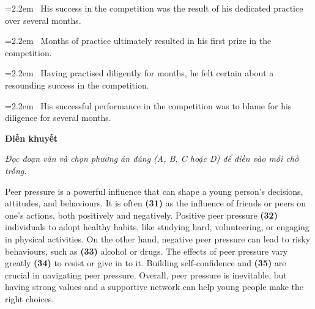\documentclass[12pt,a4paper,twoside]{article}
\newcommand{\choiceitem}[2]{%
    \tikz[baseline=-0.5ex]{%
        \node[draw=primaryBlue, circle, minimum size=1.5em, inner sep=0pt, thick] {\textbf{#1}};%
    }~#2%
}
\newenvironment{readingpassage}[1][]{%
    \begin{tcolorbox}[enhanced, colback=grayLight, colframe=secondaryBlue,
        coltitle=textDark, fonttitle=\bfseries, title={#1},
        rounded corners, arc=3mm, boxrule=1pt,
        left=15pt, right=15pt, top=10pt, bottom=10pt,
        breakable, before skip=10pt, after skip=10pt, drop fuzzy shadow]
    \setstretch{1.3}
}{\end{tcolorbox}}
\begin{document}
\par\vspace{4pt}
\noindent\hangindent=2.2em\choiceitem{A}{His success in the competition was the result of his dedicated practice over several months.}\par\vspace{4pt}
\noindent\hangindent=2.2em\choiceitem{B}{Months of practice ultimately resulted in his first prize in the competition.}\par\vspace{4pt}
\noindent\hangindent=2.2em\choiceitem{C}{Having practised diligently for months, he felt certain about a resounding success in the competition.}\par\vspace{4pt}
\noindent\hangindent=2.2em\choiceitem{D}{His successful performance in the competition was to blame for his diligence for several months.}\par\vspace{4pt}

\begin{groupbox}\textbf{\large Điền khuyết}\end{groupbox}
\textit{Đọc đoạn văn và chọn phương án đúng (A, B, C hoặc D) để điền vào mỗi chỗ trống.}
\begin{readingpassage}[]
Peer pressure is a powerful influence that can shape a young person's decisions, attitudes, and behaviours. It is often \textbf{(31)} \underline{\hspace{1.3cm}} as the influence of friends or peers on one's actions, both positively and negatively. Positive peer pressure \textbf{(32)} \underline{\hspace{1.3cm}} individuals to adopt healthy habits, like studying hard, volunteering, or engaging in physical activities. On the other hand, negative peer pressure can lead to risky behaviours, such as \textbf{(33)} \underline{\hspace{1.3cm}} alcohol or drugs. The effects of peer pressure vary greatly \textbf{(34)} \underline{\hspace{1.3cm}} to resist or give in to it. Building self-confidence and \textbf{(35)} \underline{\hspace{1.3cm}} are crucial in navigating peer pressure. Overall, peer pressure is inevitable, but having strong values and a supportive network can help young people make the right choices.
\end{readingpassage}
\end{document}
